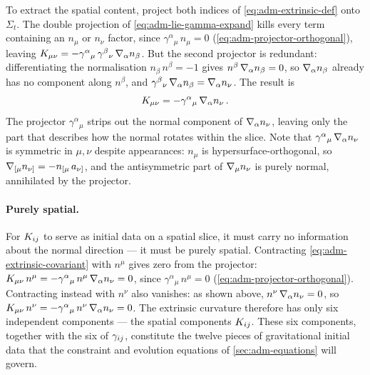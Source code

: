 To extract the spatial content, project both indices of
\cref{eq:adm-extrinsic-def} onto $\Sigma_t$.  The double projection of
\cref{eq:adm-lie-gamma-expand} kills every term containing an $n_\mu$
or $n_\nu$ factor, since
$\gamma^\alpha{}_\mu\,n_\mu = 0$
(\cref{eq:adm-projector-orthogonal}), leaving
$K_{\mu\nu}
= -\gamma^\alpha{}_\mu\,\gamma^\beta{}_\nu\,\nabla_{\alpha}n_\beta$.
But the second projector is redundant: differentiating the
normalisation $n_\beta\,n^\beta = -1$ gives
$n^\beta\,\nabla_{\alpha}n_\beta = 0$, so $\nabla_{\alpha}n_\beta$ already has
no component along $n^\beta$, and
$\gamma^\beta{}_\nu\,\nabla_{\alpha}n_\beta = \nabla_{\alpha}n_\nu$.
The result is
%
\begin{equation}
  K_{\mu\nu} = -\gamma^\alpha{}_\mu\,\nabla_{\alpha}n_\nu \,.
  \label{eq:adm-extrinsic-covariant}
\end{equation}
%
The projector $\gamma^\alpha{}_\mu$ strips out the normal component of
$\nabla_{\alpha}n_\nu$, leaving only the part that describes how the
normal rotates within the slice.  Note that
$\gamma^\alpha{}_\mu\,\nabla_{\alpha}n_\nu$ is symmetric in $\mu,\nu$
despite appearances: $n_\mu$ is hypersurface-orthogonal, so
$\nabla_{[\mu}n_{\nu]} = -n_{[\mu}\,a_{\nu]}$, and the antisymmetric part
of $\nabla_{\mu}n_\nu$ is purely normal, annihilated by the projector.

\paragraph{Purely spatial.}

For $K_{ij}$ to serve as initial data on a spatial slice, it must
carry no information about the normal direction --- it must be purely
spatial.  Contracting \cref{eq:adm-extrinsic-covariant} with $n^\mu$
gives zero from the projector: $K_{\mu\nu}\,n^\mu
= -\gamma^\alpha{}_\mu\,n^\mu\,\nabla_{\alpha}n_\nu = 0$, since
$\gamma^\alpha{}_\mu\,n^\mu = 0$
(\cref{eq:adm-projector-orthogonal}).  Contracting instead with $n^\nu$
also vanishes: as shown above,
$n^\nu\,\nabla_{\alpha}n_\nu = 0$, so
$K_{\mu\nu}\,n^\nu
= -\gamma^\alpha{}_\mu\,n^\nu\,\nabla_{\alpha}n_\nu = 0$.  The extrinsic
curvature therefore has only six independent components --- the spatial
components $K_{ij}$.  These six components, together with the six of
$\gamma_{ij}$, constitute the twelve pieces of gravitational initial
data that the constraint and evolution equations of
\cref{sec:adm-equations} will govern.

